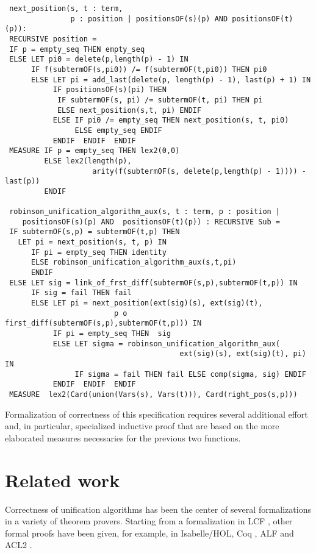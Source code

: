 \documentclass[submission,copyright,creativecommons]{eptcs}
\begin{document}
{\small
\begin{verbatim}
 next_position(s, t : term, 
               p : position | positionsOF(s)(p) AND positionsOF(t)(p)): 
 RECURSIVE position = 
 IF p = empty_seq THEN empty_seq 
 ELSE LET pi0 = delete(p,length(p) - 1) IN
      IF f(subtermOF(s,pi0)) /= f(subtermOF(t,pi0)) THEN pi0 
      ELSE LET pi = add_last(delete(p, length(p) - 1), last(p) + 1) IN
           IF positionsOF(s)(pi) THEN 
            IF subtermOF(s, pi) /= subtermOF(t, pi) THEN pi 
            ELSE next_position(s,t, pi) ENDIF
           ELSE IF pi0 /= empty_seq THEN next_position(s, t, pi0)
                ELSE empty_seq ENDIF 
           ENDIF  ENDIF  ENDIF  
 MEASURE IF p = empty_seq THEN lex2(0,0)
         ELSE lex2(length(p),
                    arity(f(subtermOF(s, delete(p,length(p) - 1)))) - last(p))
         ENDIF

 robinson_unification_algorithm_aux(s, t : term, p : position | 
    positionsOF(s)(p) AND  positionsOF(t)(p)) : RECURSIVE Sub = 
 IF subtermOF(s,p) = subtermOF(t,p) THEN 
   LET pi = next_position(s, t, p) IN
      IF pi = empty_seq THEN identity
      ELSE robinson_unification_algorithm_aux(s,t,pi)
      ENDIF
 ELSE LET sig = link_of_frst_diff(subtermOF(s,p),subtermOF(t,p)) IN
      IF sig = fail THEN fail
      ELSE LET pi = next_position(ext(sig)(s), ext(sig)(t), 
                         p o first_diff(subtermOF(s,p),subtermOF(t,p))) IN
           IF pi = empty_seq THEN  sig
           ELSE LET sigma = robinson_unification_algorithm_aux(
                                        ext(sig)(s), ext(sig)(t), pi) IN
                IF sigma = fail THEN fail ELSE comp(sigma, sig) ENDIF
           ENDIF  ENDIF  ENDIF 
 MEASURE  lex2(Card(union(Vars(s), Vars(t))), Card(right_pos(s,p)))
\end{verbatim}}

  Formalization of correctness of this specification requires several
  additional effort and, in particular, specialized inductive proof
  that are based on the more elaborated measures necessaries for the
  previous two functions.

  \section{Related work}

  Correctness of unification algorithms has been the center of several
  formalizations in a variety of theorem provers. Starting from a
  formalization in LCF \cite{Pa1985}, other formal proofs have been
  given, for example, in Isabelle/HOL, Coq
  \cite{Rou1992,BlKo2011,KoCa2009}, ALF \cite{Bove1999} and ACL2
  \cite{RRMMAH2006}.
\end{document}

